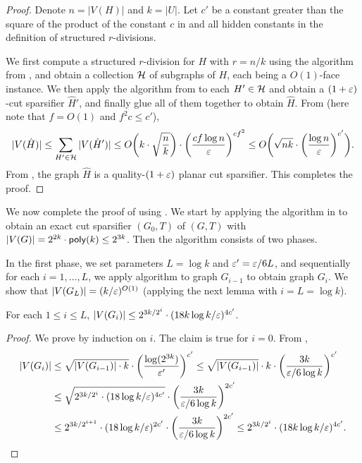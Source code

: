 \begin{proof}
Denote $n=|V(H)|$ and $k=|U|$. Let $c'$ be a constant greater than the square of the product of the constant $c$ in  and all hidden constants in the definition of structured $r$-divisions.

We first compute a structured $r$-division for $H$ with $r=n/k$ using the algorithm from , and obtain a collection ${\mathcal{H}}$ of subgraphs of $H$, each being a $O(1)$-face instance. We then apply the algorithm from  to each $H'\in {\mathcal{H}}$ and obtain a $(1+{\varepsilon})$-cut sparsifier $\hat H'$, and finally glue all of them together to obtain $\hat H$.
From  (here note that $f=O(1)$ and $f^2c\le c'$),
\[
|V(\hat H)|\le \sum_{H'\in {\mathcal{H}}}|V(\hat H')|\le O\bigg(k\cdot \sqrt\frac{n}{k}\bigg)\cdot \bigg(\frac{cf \log n}{{\varepsilon}}\bigg)^{cf^2}\le O\bigg(\sqrt{nk}\cdot \bigg(\frac{\log n}{{\varepsilon}}\bigg)^{c'}\bigg).
\]
From , the graph $\hat H$ is a quality-$(1+{\varepsilon})$ planar cut sparsifier. 
 This completes the proof.
\end{proof}


We now complete the proof of  using . We start by applying the algorithm in \cite{krauthgamer2017refined} to obtain an exact cut sparsifier $(G_0,T)$ of $(G,T)$ with $|V(G)|=2^{2k}\cdot \mathsf{poly}(k)\le 2^{3k}$.
Then the algorithm consists of two phases.

In the first phase, we set parameters $L=\log k$ and ${\varepsilon}'={\varepsilon}/6L$, and sequentially for each $i=1,\ldots,L$, we apply algorithm  to graph $G_{i-1}$ to obtain graph $G_i$.
We show that $|V(G_L)|=(k/{\varepsilon})^{O(1)}$ (applying the next lemma with $i=L=\log k$).

\begin{claim}
For each $1\le i\le L$, $|V(G_i)|\le 2^{3k/2^i}\cdot (18k\log k/{\varepsilon})^{4c'}$.
\end{claim}
\begin{proof}
We prove by induction on $i$. The claim is true for $i=0$.
From ,
\[
\begin{split}
|V(G_i)| & \le \sqrt{|V(G_{i-1})|\cdot k}\cdot \bigg(\frac{\log (2^{3k})}{{\varepsilon}'}\bigg)^{c'}
\le 
\sqrt{|V(G_{i-1})|}\cdot k\cdot\bigg(\frac{3k}{{\varepsilon}/6\log k}\bigg)^{c'}\\
& \le \sqrt{2^{3k/2^i}\cdot (18\log k/{\varepsilon})^{4c'}}\cdot\bigg(\frac{3k}{{\varepsilon}/6\log k}\bigg)^{2c'}\\
& \le 2^{3k/2^{i+1}}\cdot (18\log k/{\varepsilon})^{2c'}\cdot \bigg(\frac{3k}{{\varepsilon}/6\log k}\bigg)^{2c'}
\le 2^{3k/2^i}\cdot (18k\log k/{\varepsilon})^{4c'}.
\end{split}
\]
\end{proof}

